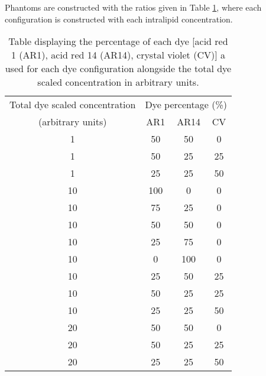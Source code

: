 Phantoms are constructed with the ratios given in Table \ref{tb:phantomratios}, where each configuration is constructed with each intralipid concentration. 

\begin{table}[ht!]
    \centering
    \caption{Table displaying the 
    percentage of each 
    dye [acid red 1 (AR1), acid red 14 (AR14), crystal violet (CV)] a used for each dye configuration alongside the total dye scaled concentration in arbitrary units.}
    \begin{tabular}{|c|c|c|c|}
        \hline
        Total dye scaled concentration & \multicolumn{3}{|c|}{Dye 
        percentage (\%)
        } \\
        (arbitrary units) & AR1 & AR14 & CV \\
        \hline
        1 & 50 & 50 & 0 \\
        1 & 50 & 25 & 25 \\
        1 & 25 & 25 & 50 \\
        10 & 100 & 0 & 0 \\
        10 & 75 & 25 & 0 \\
        10 & 50 & 50 & 0 \\
        10 & 25 & 75 & 0 \\
        10 & 0 & 100 & 0 \\
        10 & 25 & 50 & 25 \\
        10 & 50 & 25 & 25 \\
        10 & 25 & 25 & 50 \\
        20 & 50 & 50 & 0 \\
        20 & 50 & 25 & 25 \\
        20 & 25 & 25 & 50 \\
        \hline
    \end{tabular}
    \label{tb:phantomratios} %
\end{table}

